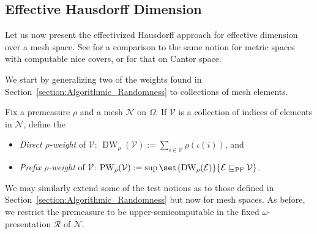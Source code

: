 \subsection{Effective Hausdorff Dimension}

Let us now present the effectivized Hausdorff approach for effective dimension over a mesh space. See \cite{May14} for a comparison to the same notion for metric spaces with computable nice covers, or \cite{Rei04, LM24} for that on Cantor space. 

We start by generalizing two of the weights found in Section~\ref{section:Algorithmic_Randomness} to collections of mesh elements.

\begin{definition}
    Fix a premeasure $\rho$ and a mesh $\mathcal{N}$ on $\Omega$. If $\mathcal{V}$ is a collection of indices of elements in $\mathcal{N}$, define the
    \begin{itemize}
        \item \textit{Direct $\rho$-weight} of $\mathcal{V}$: $\operatorname{DW}_\rho(\mathcal{V}) := \sum_{i \in \mathcal{V}} \rho(\iota(i))$, and
        \item \textit{Prefix $\rho$-weight} of $\mathcal{V}$: $\operatorname{PW}_\rho(\mathcal{V}) := \sup \set{\operatorname{DW}_\rho(\mathcal{E})}{\mathcal{E} \sqsubseteq_{\operatorname{PF}} \mathcal{V}}$.
    \end{itemize}
\end{definition}

We may similarly extend some of the test notions as to those defined in Section~\ref{section:Algorithmic_Randomness} but now for mesh spaces. As before, we restrict the premeasure to be upper-semicomputable in the fixed $\omega$-presentation $\mathscr{R}$ of $\mathcal{N}$.

